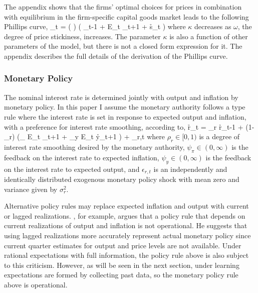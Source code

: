 The appendix shows that the firms' optimal choices for prices in combination with equilibrium in the firm-specific capital goods market leads to the following Phillips curve,
\beq \label{eq2:phillips} \pi_t = \left(  \right) \left( \gamma \pi_{t-1} + \beta E_t \pi_{t+1} + \kappa \h{s}_t \right) \eeq
where $\kappa$ decreases as $\omega$, the degree of price stickiness, increases.  The parameter $\kappa$ is also a function of other parameters of the model, but there is not a closed form expression for it.  The appendix describes the full details of the derivation of the Phillips curve.

\subsubsection{Monetary Policy}
The nominal interest rate is determined jointly with output and inflation by monetary policy.  In this paper I assume the monetary authority follows a  type rule where the interest rate is set in response to expected output and inflation, with a preference for interest rate smoothing, according to,
\beq \label{eq2:taylor} \h{r}_t = \rho_r \h{r}_{t-1} + (1-\rho_r) \left(\psi_{\pi} E_t \pi_{t+1} + \psi_y E_t \h{y}_{t+1} \right) + \epsilon_{r,t} \eeq
where $\rho_r \in [0,1)$ is a degree of interest rate smoothing desired by the monetary authority, $\psi_{\pi} \in (0,\infty)$ is the feedback on the interest rate to expected inflation, $\psi_y \in (0,\infty)$ is the feedback on the interest rate to expected output, and $\epsilon_{r,t}$ is an independently and identically distributed exogenous monetary policy shock with mean zero and variance given by $\sigma_r^2$.  

Alternative policy rules may replace expected inflation and output with current or lagged realizations.  , for example, argues that a policy rule that depends on current realizations of output and inflation is not operational.  He suggests that using lagged realizations more accurately represent actual monetary policy since current quarter estimates for output and price levels are not available.  Under rational expectations with full information, the policy rule above is also subject to this criticism.  However, as will be seen in the next section, under learning expectations are formed by collecting past data, so the monetary policy rule above is operational.

